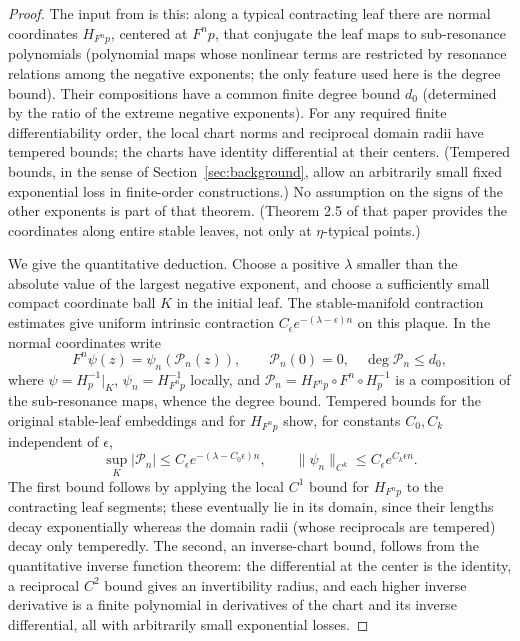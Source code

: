 \documentclass[12pt]{article}
\theoremstyle{remark}
\begin{document}
\begin{proof}
The input from \cite[Theorems 2.3, 2.5 and Section 5.1]{KalininSadovskaya2017}
is this: along a typical contracting leaf there are normal coordinates
\(H_{F^np}\), centered at \(F^np\), that conjugate the leaf maps to
sub-resonance polynomials (polynomial maps whose nonlinear terms are
restricted by resonance relations among the negative exponents; the
only feature used here is the degree bound).  Their compositions have
a common finite degree bound \(d_0\) (determined by the ratio of the
extreme negative exponents).  For any required finite
differentiability order, the
local chart norms and reciprocal domain radii have tempered bounds;
the charts have identity differential at their centers.
(Tempered bounds, in the sense of Section~\ref{sec:background}, allow
an arbitrarily small fixed exponential loss in finite-order
constructions.)  No assumption on the signs of the other exponents is
part of that theorem.  (Theorem 2.5 of that paper provides the
coordinates along entire stable leaves, not only at
\(\eta\)-typical points.)

We give the quantitative deduction.
Choose a positive \(\lambda\) smaller than the absolute value of the
largest negative exponent, and choose a sufficiently small compact
coordinate ball \(K\) in the initial leaf.
The stable-manifold contraction estimates give uniform intrinsic
contraction \(C_\epsilon e^{-(\lambda-\epsilon)n}\) on this plaque.
In the normal coordinates write
\[
 F^n\psi(z)=\psi_n(\mathcal P_n(z)),\qquad \mathcal P_n(0)=0,
 \quad \deg \mathcal P_n\le d_0,
\]
where \(\psi=H_p^{-1}|_K\), \(\psi_n=H_{F^np}^{-1}\) locally, and
\(\mathcal P_n=H_{F^np}\circ F^n\circ H_p^{-1}\) is a composition of
the sub-resonance maps, whence the degree bound.
Tempered bounds for the original stable-leaf embeddings and for
\(H_{F^np}\) show, for constants \(C_0,C_k\) independent of
\(\epsilon\),
\begin{equation}\label{eq:coordinate-bounds}
 \sup_K|\mathcal P_n|\le C_\epsilon e^{-(\lambda-C_0\epsilon)n},
 \qquad
 \|\psi_n\|_{C^k}\le C_\epsilon e^{C_k\epsilon n}.
\end{equation}
The first bound follows by applying
the local \(C^1\) bound for \(H_{F^np}\) to the contracting leaf
segments; these eventually lie in its domain, since their
lengths decay exponentially whereas the domain radii (whose
reciprocals are tempered) decay only temperedly.
The second, an inverse-chart bound, follows from the quantitative
inverse function theorem: the differential at the center is the
identity, a reciprocal \(C^2\) bound gives an invertibility radius,
and each higher inverse derivative is a finite polynomial in
derivatives of the chart and its inverse differential, all with
arbitrarily small exponential losses.


\end{proof}
\end{document}
